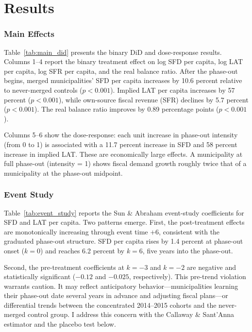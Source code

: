 \documentclass[12pt]{article}
\begin{document}
\section{Results}

\subsubsection*{Main Effects} Table~\ref{tab:main_did} presents the binary DiD and dose-response results. Columns 1--4 report the binary treatment effect on log SFD per capita, log LAT per capita, log SFR per capita, and the real balance ratio. After the phase-out begins, merged municipalities' SFD per capita increases by 10.6 percent relative to never-merged controls ($p < 0.001$). Implied LAT per capita increases by 57 percent ($p < 0.001$), while own-source fiscal revenue (SFR) declines by 5.7 percent ($p < 0.001$). The real balance ratio improves by 0.89 percentage points ($p < 0.001$).

Columns 5--6 show the dose-response: each unit increase in phase-out intensity (from 0 to 1) is associated with a 11.7 percent increase in SFD and 58 percent increase in implied LAT. These are economically large effects. A municipality at full phase-out (intensity = 1) shows fiscal demand growth roughly twice that of a municipality at the phase-out midpoint.



\subsubsection*{Event Study} Table~\ref{tab:event_study} reports the Sun \& Abraham event-study coefficients for SFD and LAT per capita. Two patterns emerge. First, the post-treatment effects are monotonically increasing through event time $+6$, consistent with the graduated phase-out structure. SFD per capita rises by 1.4 percent at phase-out onset ($k = 0$) and reaches 6.2 percent by $k = 6$, five years into the phase-out.

Second, the pre-treatment coefficients at $k = -3$ and $k = -2$ are negative and statistically significant ($-0.12$ and $-0.025$, respectively). This pre-trend violation warrants caution. It may reflect anticipatory behavior---municipalities learning their phase-out date several years in advance and adjusting fiscal plans---or differential trends between the concentrated 2014--2015 cohorts and the never-merged control group. I address this concern with the Callaway \& Sant'Anna estimator and the placebo test below.
\end{document}
